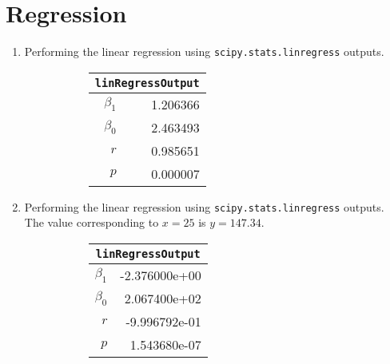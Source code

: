 \chapter{Regression}

\begin{enumerate}
	
\item Performing the linear regression using \texttt{scipy.stats.linregress} outputs. \\

\begin{figure}[H]
	\begin{subfigure}[l]{0.2\linewidth}
		\centering
		\begin{tabular}{@{}rr@{}}
			\toprule
			\multicolumn{2}{c}{\texttt{linRegressOutput}} \\
			\midrule
			$\beta_1$     &         1.206366 \\
			$\beta_0$ &         2.463493 \\
			$r$    &         0.985651 \\
			$p$    &         0.000007 \\
			\bottomrule
		\end{tabular}
	\end{subfigure}
	\begin{subfigure}[]{0.8\linewidth}
		\centering
	\end{subfigure}
\end{figure}

\item Performing the linear regression using \texttt{scipy.stats.linregress} outputs. \\
The value corresponding to $ x = 25 $ is $ y = 147.34 $.\\

\begin{figure}[H]
	\begin{subfigure}[]{0.2\linewidth}
		\centering
		\begin{tabular}{@{}rr@{}}
			\toprule
			\multicolumn{2}{c}{\texttt{linRegressOutput}} \\
			\midrule
			$\beta_1$     &    -2.376000e+00 \\
			$\beta_0$ &     2.067400e+02 \\
			$r$    &    -9.996792e-01 \\
			$p$    &     1.543680e-07 \\
			\bottomrule
		\end{tabular}
		

\end{subfigure}
\end{figure}
\end{enumerate}
